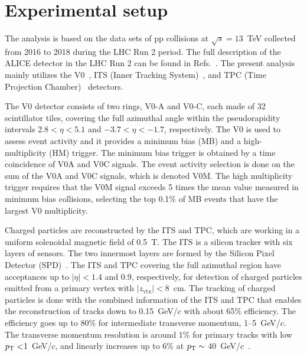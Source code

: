 

\section{Experimental setup}
\label{sec:experiment}

The analysis is based on the data sets of pp collisions at $\sqrt{s} = 13$~TeV collected from 2016 to 2018 during the LHC Run 2 period. The full description of the ALICE detector in the LHC Run 2 can be found in Refs.~\cite{Aamodt:2008zz,Abelev:2014ffa}. The present analysis mainly utilizes the V0~\cite{Abbas:2013taa}, ITS (Inner Tracking System)~\cite{aliceITS}, and TPC (Time Projection Chamber)~\cite{aliceTPC} detectors.

The V0 detector consists of two rings, V0-A and V0-C, each made of 32 scintillator tiles, covering the full azimuthal angle within the pseudorapidity intervals $2.8 < \eta < 5.1$ and $-3.7 < \eta < -1.7$, respectively. 
The V0 is used to assess event activity and it provides a minimum bias (MB) and a high-multiplicity (HM) trigger. The minimum bias trigger is obtained by a time coincidence of V0A and V0C signals. The event activity selection is done on the sum of the V0A and V0C signals, which is denoted V0M. The high multiplicity trigger requires that the V0M signal exceeds 5 times the mean value measured in minimum bias collisions, selecting the top 0.1\% of MB events that have the largest V0 multiplicity.


Charged particles are reconstructed by the ITS and TPC, which are working in a uniform solenoidal magnetic field of 0.5~T. The ITS is a silicon tracker with six layers of sensors. The two innermost layers are formed by the Silicon Pixel Detector (SPD)~\cite{Santoro2009:ALICESPD}.
The ITS and TPC covering the full azimuthal region have acceptances up to $|\eta| < 1.4$ and 0.9, respectively, for detection of charged particles emitted from a primary vertex with $|z_\mathrm{vtx}| < 8$~cm. The tracking of charged particles is done with the combined information of the ITS and TPC that enables the reconstruction of tracks down to 0.15~GeV/$c$ with about 65\% efficiency. The efficiency goes up to 80\% for intermediate transverse momentum, 1--5~GeV/$c$. The transverse momentum resolution is around 1\% for primary tracks with low $p_\mathrm{T}<$1~GeV/$c$, and linearly increases up to 6\% at $p_\mathrm{T} \sim$ 40~GeV/$c$~\cite{Contin_2012:ITSPTRES}.


